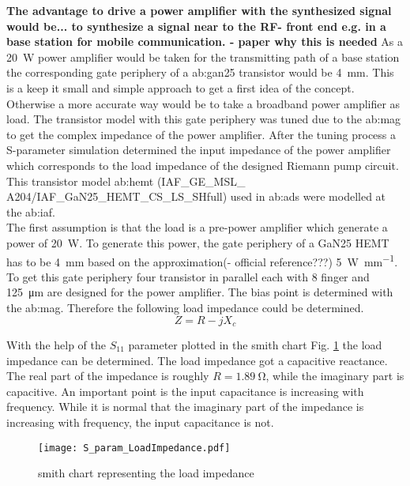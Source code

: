 \textbf{The advantage to drive a power amplifier with the synthesized signal would be... to synthesize a signal near to the RF- front end e.g. in a base station for mobile communication. - paper why this is needed}
As a \SI{20}{\watt} power amplifier would be taken for the transmitting path of a base station the corresponding gate periphery of a \gls{ab:gan}25 transistor would be \SI{4}{\milli \metre}.
This is a keep it small and simple approach to get a first idea of the concept. Otherwise a more accurate way would be to take a broadband power amplifier as load.
The transistor model with this gate periphery was tuned due to the \gls{ab:mag} to get the complex impedance of the power amplifier.
After the tuning process a S-parameter simulation determined the input impedance of the power amplifier which corresponds to the load impedance of the designed Riemann pump circuit.
This transistor model \gls{ab:hemt} (IAF\_GE\_MSL\_ A204/IAF\_GaN25\_HEMT\_CS\_LS\_SHfull) used in \gls{ab:ads} were modelled at the \gls{ab:iaf}.\\

 The first assumption is that the load is a pre-power amplifier which generate a power of \SI{20}{\watt}. To generate this power, the gate periphery of a GaN25 HEMT has to be \SI{4}{\milli \metre} based on the approximation(- official reference???) \SI[per-mode=fraction]{5}{\watt\per\milli\metre}. To get this gate periphery four transistor in parallel each with 8 finger and \SI{125}{\micro \metre} are designed for the power amplifier. The bias point is determined with the \gls{ab:mag}. Therefore the following load impedance could be determined.
\begin{equation}
Z = R - jX_c
\end{equation}

With the help of the $S_{11}$ parameter plotted in the smith chart Fig. \ref{fig:smith_load_impedance} the load impedance can be determined.
The load impedance got a capacitive reactance.
 The real part of the impedance is roughly $R = \SI{1.89}{\ohm}$, while the imaginary part is capacitive. An important point is the input capacitance is increasing with frequency. While it is normal that the imaginary part of the impedance is increasing with frequency, the input capacitance is not.

 \begin{figure}[ht]
	\centering
  \texttt{[image: S\_param\_LoadImpedance.pdf]}
	\caption{smith chart representing the load impedance}
	\label{fig:smith_load_impedance}
\end{figure}

